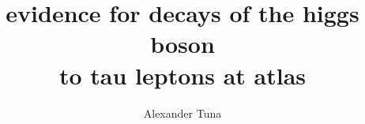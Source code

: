 \title{evidence for decays of the higgs boson\\ to tau leptons at atlas}
    
\author{Alexander Tuna}

\newcommand{\adviser}{H.H. Williams, Professor, Physics}
\newcommand{\advisershort}{H.H. Williams}
\newcommand{\myinstitution}{The University of Pennsylvania}
\newcommand{\chairperson}{Marija Drndic, Professor, Physics}

\newcommand{\committeeOne}{I. Joseph Kroll, Professor, Physics}
\newcommand{\committeeTwo}{Elliot Lipeles, Assistant Professor, Physics}
\newcommand{\committeeThree}{Burt Ovrut, Professor, Physics}
\newcommand{\committeeFour}{Philip Nelson, Professor, Physics}



